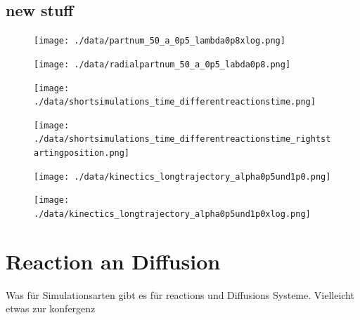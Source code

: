 \documentclass[
  a4paper,BCOR10mm,oneside,
  bibtotoc,idxtotoc,
  headsepline,footsepline,%
  fleqn,openbib
]{scrbook}
\begin{document}
\section{new stuff}
\begin{figure}[h!]
  \centering
  \texttt{[image: ./data/partnum\_50\_a\_0p5\_lambda0p8xlog.png]}
  \captionsetup{width=\linewidth}
  \label{fig:kineticsreactionkonstatvariationlog}
\end{figure}
\begin{figure}[h!]
  \centering
  \texttt{[image: ./data/radialpartnum\_50\_a\_0p5\_labda0p8.png]}
  \captionsetup{width=\linewidth}
  \label{fig:radialabc}
\end{figure}

\begin{figure}[h!]
  \centering
  \texttt{[image: ./data/shortsimulations\_time\_differentreactionstime.png]}
  \captionsetup{width=\linewidth}
  \label{fig:kineticsreactionkonstatvariation}
\end{figure}

\begin{figure}[h!]
  \centering
  \texttt{[image: ./data/shortsimulations\_time\_differentreactionstime\_rightstartingposition.png]}
  \captionsetup{width=\linewidth}
  \label{fig:kineticsreactionkonstatvariationpositionright}
\end{figure}

\begin{figure}[h!]
  \centering
  \texttt{[image: ./data/kinectics\_longtrajectory\_alpha0p5und1p0.png]}
  \captionsetup{width=\linewidth}
  \label{fig:alphavariation}
\end{figure}


\begin{figure}[h!]
  \centering
  \texttt{[image: ./data/kinectics\_longtrajectory\_alpha0p5und1p0xlog.png]}
  \captionsetup{width=\linewidth}
  \label{fig:alphavariationlog}
\end{figure}

\chapter{Reaction an Diffusion}
Was für Simulationsarten gibt es für reactions und Diffusions Systeme. 
Vielleicht etwas zur konfergenz
\end{document}
